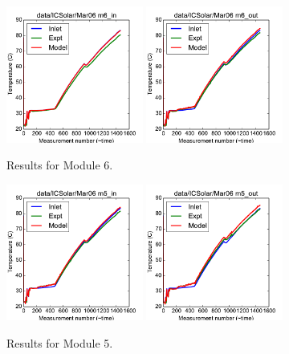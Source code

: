 \documentclass{article}
\begin{document}
\begin{figure}[!ht]
\centering
\includegraphics[width=0.4\textwidth]{../../data/ICSolar/images/Mar06_m6_in.pdf}\hspace{0.05\textwidth}
\includegraphics[width=0.4\textwidth]{../../data/ICSolar/images/Mar06_m6_out.pdf}\hspace{0.05\textwidth}\\
\caption{Results for Module 6.}\end{figure}
\begin{figure}[!ht]
\centering
\includegraphics[width=0.4\textwidth]{../../data/ICSolar/images/Mar06_m5_in.pdf}\hspace{0.05\textwidth}
\includegraphics[width=0.4\textwidth]{../../data/ICSolar/images/Mar06_m5_out.pdf}\hspace{0.05\textwidth}\\
\caption{Results for Module 5.}\end{figure}
\end{document}
